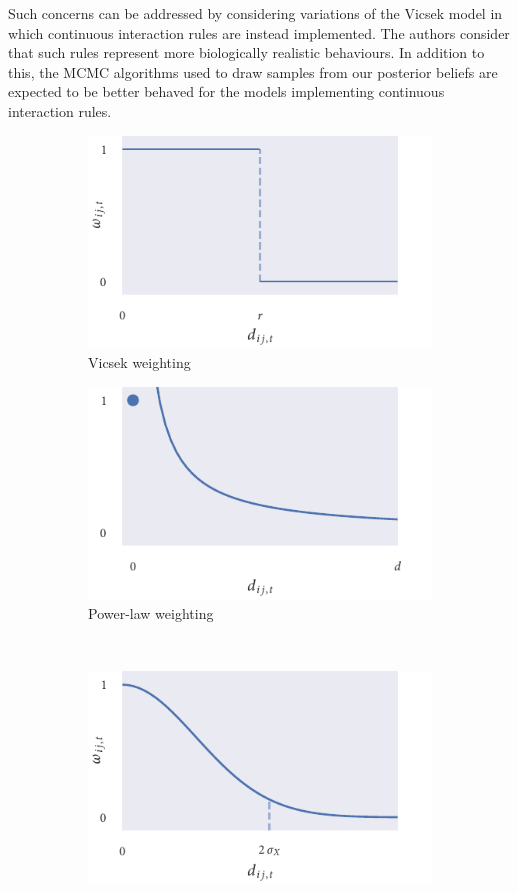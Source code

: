 Such concerns can be addressed by considering variations of the Vicsek model in
which continuous interaction rules are instead implemented. The authors
consider that such rules represent more biologically realistic behaviours. In
addition to this, the MCMC algorithms used to draw samples from our posterior
beliefs are expected to be better behaved for the models implementing
continuous interaction rules.

\begin{figure}[tb]
    \begin{subfigure}[b]{0.5\textwidth}
        \caption{Vicsek weighting}
        \label{fig:vicsek_weight}
        \includegraphics{vicsek_weighting.pdf}
    \end{subfigure}%
    \begin{subfigure}[b]{0.5\textwidth}
        \caption{Power-law weighting}
        \label{fig:power_weight}
        \includegraphics{power_weighting.pdf}
    \end{subfigure}\\
    \begin{subfigure}[b]{0.5\textwidth}
        \includegraphics{gaussian_weighting.pdf}

\end{subfigure}
\end{figure}
